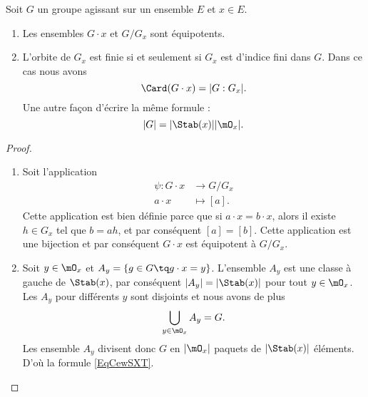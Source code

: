 \begin{proposition}     \label{Propszymlr}
    Soit \( G\) un groupe agissant sur un ensemble \( E\) et \( x\in E\).
    \begin{enumerate}
        \item
            Les ensembles \( G\cdot x\) et \( G/G_x\) sont équipotents.
        \item
            L'orbite de \( G_x\) est finie si et seulement si \( G_x\) est d'indice fini dans \( G\). Dans ce cas nous avons 
            \begin{equation}
                \Card(G\cdot x)=| G:G_x |.
            \end{equation}
            Une autre façon d'écrire la même formule :
            \begin{equation}        \label{EqCewSXT}
                | G |=| \Stab(x) | |\mO_x |.
            \end{equation}
    \end{enumerate}
\end{proposition}

\begin{proof}
    \begin{enumerate}
        \item
    Soit l'application
    \begin{equation}
        \begin{aligned}
            \psi\colon G\cdot x&\to G/G_x \\
            a\cdot x&\mapsto [a]. 
        \end{aligned}
    \end{equation}
    Cette application est bien définie parce que si \( a\cdot x=b\cdot x\), alors il existe \( h\in G_x\) tel que \( b=ah\), et par conséquent \( [a]=[b]\). Cette application est une bijection et par conséquent \( G\cdot x\) est équipotent à \( G/G_x\).
    \item
        Soit \( y\in \mO_x\) et \( A_y=\{ g\in G\tq g\cdot x=y \}\). L'ensemble \( A_y\) est une classe à gauche de \( \Stab(x)\), par conséquent \( | A_y |=|\Stab(x)|\) pour tout \( y\in\mO_x\). Les \( A_y\) pour différents \( y\) sont disjoints et nous avons de plus
        \begin{equation}
            \bigcup_{y\in\mO_x}A_y=G.
        \end{equation}
        Les ensemble \( A_y\) divisent donc \( G\) en \( | \mO_x |\) paquets de \( | \Stab(x) |\) éléments. D'où la formule \eqref{EqCewSXT}.
        
    \end{enumerate}
\end{proof}

